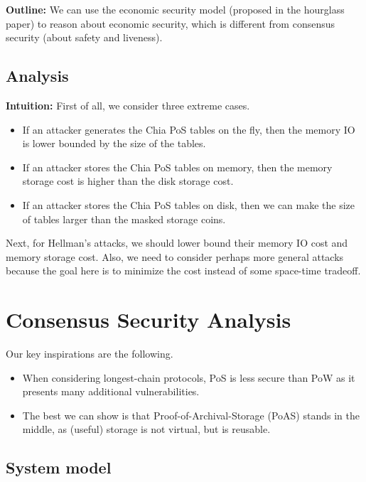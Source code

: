 \documentclass[12pt,draftcls,onecolumn]{IEEEtran}
\begin{document}
{\bf Outline:} We can use the economic security model (proposed in the hourglass paper) to reason about economic security, which is different from consensus security (about safety and liveness).

\subsection{Analysis}

{\bf Intuition:} First of all, we consider three extreme cases.
\begin{itemize}
    \item If an attacker generates the Chia PoS tables on the fly, then the memory IO is lower bounded by the size of the tables.
    \item If an attacker stores the Chia PoS tables on memory, then the memory storage cost is higher than the disk storage cost.
    \item If an attacker stores the Chia PoS tables on disk, then we can make the size of tables larger than the masked storage coins.
\end{itemize}

Next, for Hellman's attacks, we should lower bound their memory IO cost and memory storage cost.
Also, we need to consider perhaps more general attacks because the goal here is to minimize the cost instead of some space-time tradeoff.

\section{Consensus Security Analysis}

Our key inspirations are the following.

\begin{itemize}
    \item When considering longest-chain protocols, PoS is less secure than PoW as it presents many additional vulnerabilities. 
    \item The best we can show is that Proof-of-Archival-Storage (PoAS) stands in the middle, as (useful) storage is not virtual, but is reusable.
\end{itemize}

\subsection{System model}

\end{document}

